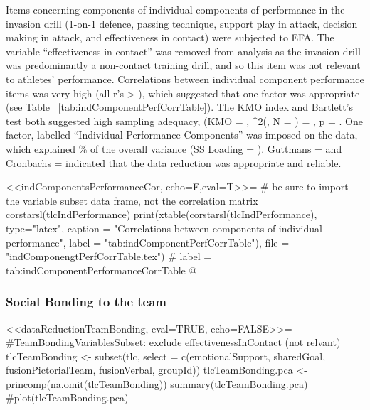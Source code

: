 Items concerning components of individual components of performance in the invasion drill (1-on-1 defence, passing technique, support play in attack, decision making in attack, and effectiveness in contact) were subjected to EFA.  The variable ``effectiveness in contact'' was removed from analysis as the invasion drill was predominantly a non-contact training drill, and so this item was not relevant to athletes' performance.  Correlations between individual component performance items was very high (all r's > ), which suggested that one factor was appropriate (see Table ~\ref{tab:indComponentPerfCorrTable}).
The KMO index and Bartlett's test both suggested high sampling adequacy, (KMO =  , \chi^2(, N = ) = , p = . One factor, labelled ``Individual Performance Components'' was imposed on the data, which explained  \% of the overall variance (SS Loading = ).  Guttmans \lambda =   and  Cronbachs \alpha =   indicated that the data reduction was appropriate and reliable.

<<indComponentsPerformanceCor, echo=F,eval=T>>=
  # be sure to import the variable subset data frame, not the correlation matrix
  corstarsl(tlcIndPerformance)
  print(xtable(corstarsl(tlcIndPerformance), type="latex",
                      caption = "Correlations between components of individual performance",
                      label = "tab:indComponentPerfCorrTable"),
                      file = "indComponengtPerfCorrTable.tex")
  # label = tab:indComponentPerformanceCorrTable
@







\subsubsection{Social Bonding to the team}

<<dataReductionTeamBonding, eval=TRUE, echo=FALSE>>=
  #TeamBondingVariablesSubset: exclude effectivenessInContact (not relvant)
  tlcTeamBonding <- subset(tlc, select = c(emotionalSupport, sharedGoal,
                                                fusionPictorialTeam, fusionVerbal, groupId))
  tlcTeamBonding.pca <- princomp(na.omit(tlcTeamBonding))
  summary(tlcTeamBonding.pca)
  #plot(tlcTeamBonding.pca)

